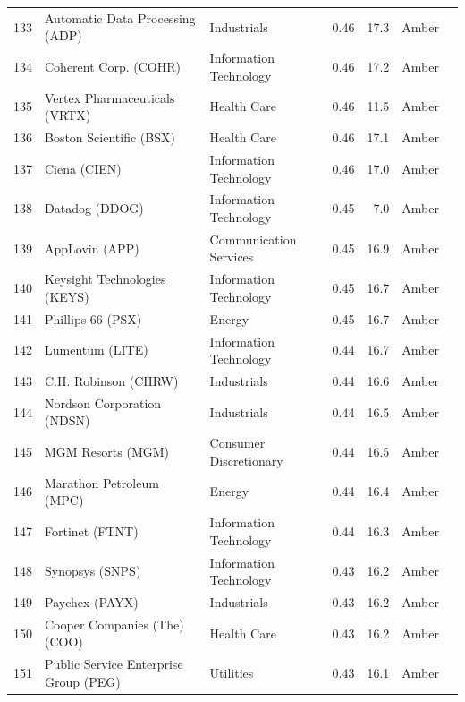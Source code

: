 \documentclass[11pt,a4paper]{article}
\begin{document}
{\begin{longtable}{r p{4.4cm} p{2.8cm} r r l l}
133 & Automatic Data Processing (ADP) & Industrials & 0.46 & 17.3 & \cellcolor[HTML]{FFEB9C}Amber &  \\
134 & Coherent Corp. (COHR) & Information Technology & 0.46 & 17.2 & \cellcolor[HTML]{FFEB9C}Amber &  \\
135 & Vertex Pharmaceuticals (VRTX) & Health Care & 0.46 & 11.5 & \cellcolor[HTML]{FFEB9C}Amber &  \\
136 & Boston Scientific (BSX) & Health Care & 0.46 & 17.1 & \cellcolor[HTML]{FFEB9C}Amber &  \\
137 & Ciena (CIEN) & Information Technology & 0.46 & 17.0 & \cellcolor[HTML]{FFEB9C}Amber &  \\
138 & Datadog (DDOG) & Information Technology & 0.45 & 7.0 & \cellcolor[HTML]{FFEB9C}Amber &  \\
139 & AppLovin (APP) & Communication Services & 0.45 & 16.9 & \cellcolor[HTML]{FFEB9C}Amber &  \\
140 & Keysight Technologies (KEYS) & Information Technology & 0.45 & 16.7 & \cellcolor[HTML]{FFEB9C}Amber &  \\
141 & Phillips 66 (PSX) & Energy & 0.45 & 16.7 & \cellcolor[HTML]{FFEB9C}Amber &  \\
142 & Lumentum (LITE) & Information Technology & 0.44 & 16.7 & \cellcolor[HTML]{FFEB9C}Amber &  \\
143 & C.H. Robinson (CHRW) & Industrials & 0.44 & 16.6 & \cellcolor[HTML]{FFEB9C}Amber &  \\
144 & Nordson Corporation (NDSN) & Industrials & 0.44 & 16.5 & \cellcolor[HTML]{FFEB9C}Amber &  \\
145 & MGM Resorts (MGM) & Consumer Discretionary & 0.44 & 16.5 & \cellcolor[HTML]{FFEB9C}Amber &  \\
146 & Marathon Petroleum (MPC) & Energy & 0.44 & 16.4 & \cellcolor[HTML]{FFEB9C}Amber &  \\
147 & Fortinet (FTNT) & Information Technology & 0.44 & 16.3 & \cellcolor[HTML]{FFEB9C}Amber &  \\
148 & Synopsys (SNPS) & Information Technology & 0.43 & 16.2 & \cellcolor[HTML]{FFEB9C}Amber &  \\
149 & Paychex (PAYX) & Industrials & 0.43 & 16.2 & \cellcolor[HTML]{FFEB9C}Amber &  \\
150 & Cooper Companies (The) (COO) & Health Care & 0.43 & 16.2 & \cellcolor[HTML]{FFEB9C}Amber &  \\
151 & Public Service Enterprise Group (PEG) & Utilities & 0.43 & 16.1 & \cellcolor[HTML]{FFEB9C}Amber &  \\

\end{longtable}}
\end{document}
